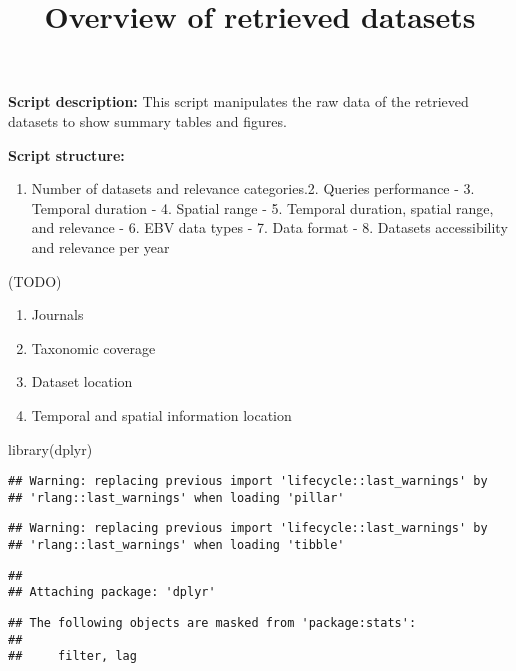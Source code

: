 \documentclass[
]{article}
\title{Overview of retrieved datasets}
\author{}
\date{\vspace{-2.5em}}
\newenvironment{Shaded}{\begin{snugshade}}{\end{snugshade}}
\newcommand{\FunctionTok}[1]{\textcolor[rgb]{0.00,0.00,0.00}{#1}}
\newcommand{\NormalTok}[1]{#1}
\providecommand{\tightlist}{%
  \setlength{\itemsep}{0pt}\setlength{\parskip}{0pt}}
\begin{document}
\maketitle

\textbf{Script description:} This script manipulates the raw data of the
retrieved datasets to show summary tables and figures.

\textbf{Script structure:}

\begin{enumerate}
\def\labelenumi{\arabic{enumi}.}
\tightlist
\item
  Number of datasets and relevance categories.2. Queries performance -
  3. Temporal duration - 4. Spatial range - 5. Temporal duration,
  spatial range, and relevance - 6. EBV data types - 7. Data format - 8.
  Datasets accessibility and relevance per year
\end{enumerate}

(TODO)

\begin{enumerate}
\def\labelenumi{\arabic{enumi}.}
\setcounter{enumi}{8}
\item
  Journals
\item
  Taxonomic coverage
\item
  Dataset location
\item
  Temporal and spatial information location
\end{enumerate}

\begin{Shaded}
\begin{Highlighting}[]
\FunctionTok{library}\NormalTok{(dplyr)}
\end{Highlighting}
\end{Shaded}

\begin{verbatim}
## Warning: replacing previous import 'lifecycle::last_warnings' by
## 'rlang::last_warnings' when loading 'pillar'
\end{verbatim}

\begin{verbatim}
## Warning: replacing previous import 'lifecycle::last_warnings' by
## 'rlang::last_warnings' when loading 'tibble'
\end{verbatim}

\begin{verbatim}
## 
## Attaching package: 'dplyr'
\end{verbatim}

\begin{verbatim}
## The following objects are masked from 'package:stats':
## 
##     filter, lag
\end{verbatim}
\end{document}
